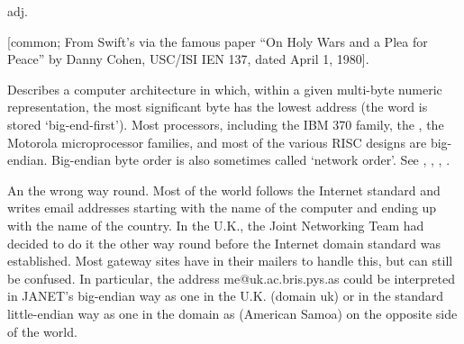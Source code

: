  adj.

[common; From Swift's  via the famous paper ``On
Holy Wars and a Plea for Peace'' by Danny Cohen, USC/ISI IEN 137, dated April 1,
1980].
\begin{inparaenum}
    \item Describes a computer architecture in which, within a given
        multi-byte numeric representation, the most significant byte has
        the lowest address (the word is stored `big-end-first'). Most
        processors, including the IBM 370 family, the
        , the Motorola microprocessor families, and
        most of the various RISC designs are big-endian. Big-endian byte
        order is also sometimes called `network order'. See
        , ,
        , .
    \item An  the wrong way round. Most of
        the world follows the Internet standard and writes email
        addresses starting with the name of the computer and ending up
        with the name of the country. In the U.K., the Joint Networking
        Team had decided to do it the other way round before the
        Internet domain standard was established. Most gateway sites
        have  in their mailers to handle this, but
        can still be confused. In particular, the address
        me@uk.ac.bris.pys.as could be interpreted in JANET's big-endian
        way as one in the U.K. (domain uk) or in the standard
        little-endian way as one in the domain as (American Samoa) on
        the opposite side of the world.
\end{inparaenum}

